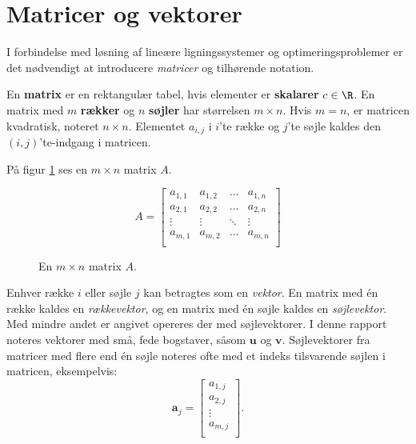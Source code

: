 \section{Matricer og vektorer}
%
I forbindelse med løsning af lineære ligningssystemer og optimeringsproblemer er det nødvendigt at introducere \textit{matricer} og tilhørende notation. 
%
\begin{defn}{}{}
En \textbf{matrix} er en rektangulær tabel, hvis elementer er \textbf{skalarer} $c \in \R$. 
En matrix med $m$ \textbf{rækker} og $n$ \textbf{søjler} har størrelsen $m \times n$.
Hvis $m=n$, er matricen kvadratisk, noteret $n \times n$.
Elementet $a_{i,j}$ i $i$'te række og $j$'te søjle kaldes den $(i,j)$'te-indgang i matricen. 
\end{defn}
\noindent
%
På figur \ref{fig:matrix_gen_eks} ses en $m \times n$ matrix $A$.
%
\begin{figure}[H]
	\begin{center}
$$
A=
\begin{bmatrix}
a_{1,1} & a_{1,2} & \ldots & a_{1,n} \\
a_{2,1} & a_{2,2} & \ldots & a_{2,n} \\
\vdots  & \vdots  & \ddots & \vdots \\
a_{m,1} & a_{m,2} & \ldots & a_{m,n} \\
\end{bmatrix}
$$
	\end{center}
	\caption{En $m \times n$ matrix $A$.}
	\label{fig:matrix_gen_eks}
\end{figure}
%
\noindent
Enhver række $i$ eller søjle $j$ kan betragtes som en \textit{vektor}. 
En matrix med én række kaldes en \textit{rækkevektor}, og en matrix med én søjle kaldes en \textit{søjlevektor}. 
Med mindre andet er angivet opereres der med søjlevektorer.
I denne rapport noteres vektorer med små, fede bogstaver, såsom $\textbf{u}$ og $\textbf{v}$. 
Søjlevektorer fra matricer med flere end én søjle noteres ofte med et indeks tilsvarende søjlen i matricen, eksempelvis:
%
$$
\textbf{a}_j= 
\begin{bmatrix}
a_{1,j} \\
a_{2,j} \\
\vdots \\
a_{m,j} \\
\end{bmatrix}.
$$ 
